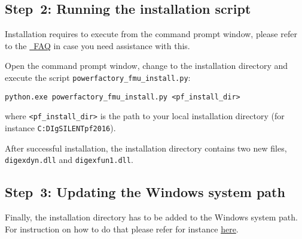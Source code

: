 \subsection*{Step~2: Running the installation script}

Installation requires to execute \python from the command prompt window, please refer to the \href{https://docs.python.org/2/faq/windows.html}{\python~FAQ} in case you need assistance with this.

Open the command prompt window, change to the installation directory and execute the script \texttt{powerfactory\_fmu\_install.py}:
\begin{verbatim}
python.exe powerfactory_fmu_install.py <pf_install_dir>
\end{verbatim}
where \texttt{<pf\_install\_dir>} is the path to your local \pf installation directory (for instance \texttt{C:DIgSILENTpf2016}).

After successful installation, the \pf installation directory contains two new files, \texttt{digexdyn.dll} and \texttt{digexfun1.dll}.


\subsection*{Step~3: Updating the Windows system path}

Finally, the \pf installation directory has to be added to the Windows system path. For instruction on how to do that please refer for instance \href{https://de.mathworks.com/matlabcentral/answers/94933-how-do-i-set-my-system-path-under-windows}{here}.